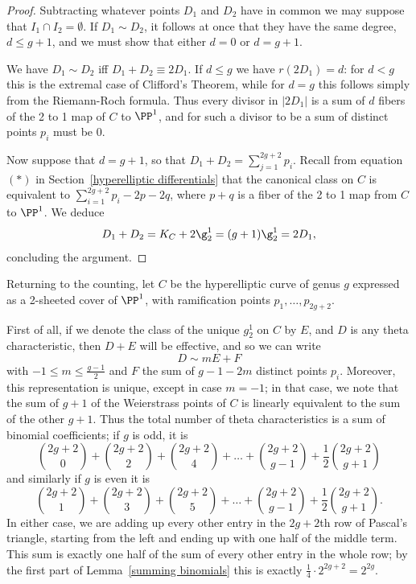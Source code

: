 \begin{proof}
Subtracting whatever points $D_1$ and $D_2$ have in common we may suppose
that $I_1\cap I_2 = \emptyset$. If $D_1\sim D_2$, it follows at once that they have the same degree, $d\leq g+1$, and we must show that either $d=0$ or $d=g+1$.

We have $D_1\sim D_2$ iff $D_1+D_2\equiv 2D_1$. If
$d\leq g$ we have $r(2D_1) = d$: for $d<g$ this is
the extremal case of Clifford's Theorem, while for $d = g$ this follows simply from the 
Riemann-Roch formula. Thus every divisor in $|2D_1|$ is a sum of $d$ fibers of the 
2 to 1 map of $C$ to $\PP^1$, and for such a divisor to be a sum of distinct points $p_i$
must be 0.

Now suppose that $d=g+1$, so that $D_1+D_2 = \sum_{j=1}^{2g+2}p_i$. Recall from equation
$(*)$ in Section~\ref{hyperelliptic differentials} that the canonical class on $C$ is
equivalent to $\sum_{i=1}^{2g+2}p_i-2p -2q$, where $p+q$ is a fiber of the 2 to 1 map
from $C$ to $\PP^1$. We deduce
$$
D_1+D_2 = K_C+2\g^1_2 = (g+1)\g^1_2 = 2D_1,
$$
concluding the argument.
\end{proof}


Returning to the counting, let $C$ be the hyperelliptic curve of genus $g$ expressed as a 2-sheeted cover of $\PP^1$, with ramification points $p_1,\dots,p_{2g+2}$. 

First of all, if we denote the class of the unique $g^1_2$ on $C$ by $E$, and $D$ is any theta characteristic, then $D+E$ will be effective, and so we can write
$$
D \sim mE + F
$$
with $-1 \leq m \leq \frac{g-1}{2}$ and $F$ the sum of $g-1-2m$ distinct points $p_i$. Moreover, this representation is unique, except in case $m=-1$; in that case, we note that the sum of $g+1$ of the Weierstrass points of $C$ is linearly equivalent to the sum of the other $g+1$. Thus the total number of theta characteristics is a sum of binomial coefficients; if $g$ is odd, it is
$$
\binom{2g+2}{0} + \binom{2g+2}{2} + \binom{2g+2}{4} + \dots + \binom{2g+2}{g-1} + \frac{1}{2}\binom{2g+2}{g+1}
$$ 
and similarly if $g$ is even it is
$$
\binom{2g+2}{1} + \binom{2g+2}{3} + \binom{2g+2}{5} + \dots + \binom{2g+2}{g-1} + \frac{1}{2}\binom{2g+2}{g+1}.
$$ 
In either case, we are adding up every other entry in the $2g+2$th row of Pascal's triangle, starting from the left and ending up with one half of the middle term. This sum is exactly one half of the sum of every other entry in the whole row; by the first part of Lemma~\ref{summing binomials} this is exactly $\frac{1}{4} \cdot 2^{2g+2} = 2^{2g}$.

